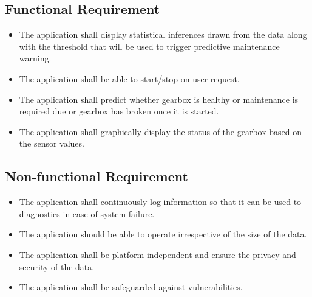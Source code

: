 \label{sec:requirment-management}
\subsection{Functional Requirement}
\begin{itemize}
	\item The application shall display statistical inferences drawn from the data along with the threshold that will be used to trigger predictive maintenance warning. 
	\item The application shall be able to start/stop on user request.
	\item The application shall predict whether gearbox is healthy or maintenance is required due or gearbox has broken once it is started.
	\item The application shall graphically display the status of the gearbox based on the sensor values.
\end{itemize}
\subsection{Non-functional Requirement}
\begin{itemize}
	\item The application shall continuously log information so that it can be used to diagnostics in case of system failure.
	\item The application should be able to operate irrespective of the size of the data.
	\item The application shall be platform independent and ensure the privacy and security of the data.
	\item The application shall be safeguarded against vulnerabilities.
\end{itemize}
           